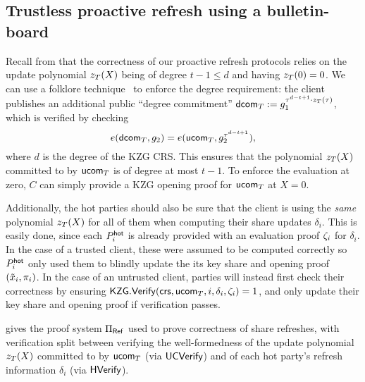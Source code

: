 \subsection{Trustless proactive refresh using a bulletin-board}\label{sec:fs_protocol}

Recall from  that the correctness of our proactive refresh protocols relies on the update polynomial $z_{T}(X)$ being of degree $t-1 \leq d$ and having $z_{T}(0)=0$. 
We can use a folklore technique~\cite[\S2.5]{EC:CHMMVW20} 
to enforce the degree requirement: the client publishes an additional public ``degree commitment'' $\mathsf{dcom}_{T} := g_1^{\tau^{d-t+1} \cdot z_{T}(\tau)}$, %
which is verified by checking
\[
    e(\dcom_\timeT, g_2) = e(\ucom_\timeT, g_2^{\tau^{d-t+1}}), %
\]
where $d$ is the degree of the KZG CRS. This ensures that the polynomial $z_{T}(X)$ committed to by $\mathsf{ucom}_{T}$ is of degree at most $t-1$. To enforce the evaluation at zero, $C$ can simply provide a KZG opening proof for $\mathsf{ucom}_{T}$ at $X=0$.

Additionally, the hot parties should also be sure that the client is using the \emph{same} polynomial $z_{T}(X)$ for all of them when computing their share updates $\delta_i$. This is easily done, since each $P_i^{\mathsf{hot}}$ is already provided with an evaluation proof $\zeta_i$ for $\delta_i$. In the case of a trusted client, these were assumed to be computed correctly so $P_i^{\mathsf{hot}}$ only used them to blindly update the its key share and opening proof $(\tilde{x}_i, \pi_i)$. In the case of an untrusted client, parties will instead first check their correctness by ensuring $\mathsf{KZG}.\mathsf{Verify}(\mathsf{crs}, \mathsf{ucom}_{T}, i, \delta_i, \zeta_i) = 1$, and only update their key share and opening proof if verification passes.




 gives the proof system $\Pi_{\sf Ref}$ used to prove correctness of share refreshes, with verification split between verifying the well-formedness of the update polynomial $z_{T}(X)$ committed to by ${\sf u}\mathsf{com}_{T}$ (via ${\sf UC}\mathsf{Verify}$) and of each hot party's refresh information $\delta_i$ (via ${\sf H}\mathsf{Verify}$).


